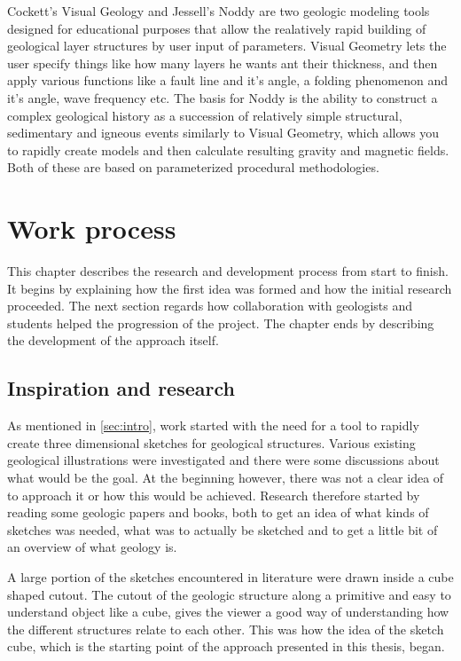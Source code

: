 \documentclass[a4paper,12pt]{report}
\newcommand{\secref}[1]{\autoref{#1}}
\begin{document}
Cockett's Visual Geology \cite{Cockett:Online} and Jessell's Noddy \cite{jessell1981noddy} are two geologic modeling tools designed for educational purposes that allow the realatively rapid building of geological layer structures by user input of parameters. Visual Geometry lets the user specify things like how many layers he wants ant their thickness, and then apply various functions like a fault line and it's angle, a folding phenomenon and it's angle, wave frequency etc. The basis for Noddy is the ability to construct a complex geological history as a succession of relatively simple structural, sedimentary and igneous events similarly to Visual Geometry, which allows you to rapidly create models and then calculate resulting gravity and magnetic fields. Both of these are based on parameterized procedural methodologies.


\clearpage



\chapter{Work process}
This chapter describes the research and development process from start to finish. It begins by explaining how the first idea was formed and how the initial research proceeded. The next section regards how collaboration with geologists and students helped the progression of the project. The chapter ends by describing the development of the approach itself.
\label{subsec:work}
\section{Inspiration and research}
As mentioned in \secref{sec:intro}, work started with the need for a tool to rapidly create three dimensional sketches for geological structures. Various existing geological illustrations were investigated and there were some discussions about what would be the goal. At the beginning however, there was not a clear idea of to approach it or how this would be achieved. Research therefore started by reading some geologic papers and books, both to get an idea of what kinds of sketches was needed, what was to actually be sketched and to get a little bit of an overview of what geology is.

A large portion of the sketches encountered in literature were drawn inside a cube shaped cutout. The cutout of the geologic structure along a primitive and easy to understand object like a cube, gives the viewer a good way of understanding how the different structures relate to each other. This was how the idea of the sketch cube, which is the starting point of the approach presented in this thesis, began.
\end{document}
